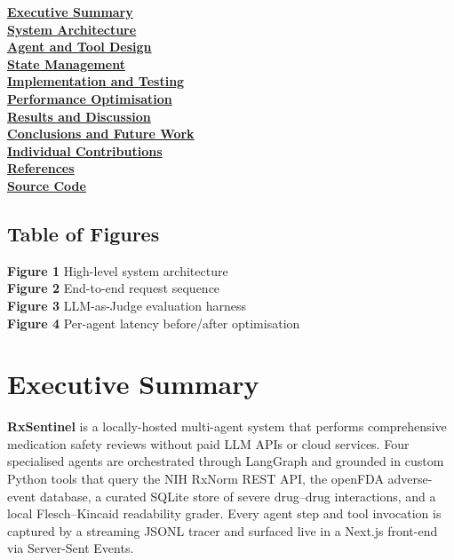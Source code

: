 \documentclass[11pt]{article}
\begin{document}
{\setlength{\parskip}{0.2em}
\noindent
\textbf{\hyperref[execsum]{Executive Summary}} \\
\textbf{\hyperref[arch]{System Architecture}} \\
\textbf{\hyperref[agents]{Agent and Tool Design}} \\
\textbf{\hyperref[state]{State Management}} \\
\textbf{\hyperref[impl]{Implementation and Testing}} \\
\textbf{\hyperref[perf]{Performance Optimisation}} \\
\textbf{\hyperref[results]{Results and Discussion}} \\
\textbf{\hyperref[conclusions]{Conclusions and Future Work}} \\
\textbf{\hyperref[contrib]{Individual Contributions}} \\
\textbf{\hyperref[refs]{References}} \\
\textbf{\hyperref[code]{Source Code}} \\
}

\subsection*{Table of Figures}
{\setlength{\parskip}{0.2em}
\noindent
\textbf{Figure 1} \quad High-level system architecture \\
\textbf{Figure 2} \quad End-to-end request sequence \\
\textbf{Figure 3} \quad LLM-as-Judge evaluation harness \\
\textbf{Figure 4} \quad Per-agent latency before/after optimisation \\
}

\newpage

\section*{Executive Summary}\label{execsum}

\textbf{RxSentinel} is a locally-hosted multi-agent system that performs
comprehensive medication safety reviews without paid LLM APIs or cloud
services. Four specialised agents are orchestrated through LangGraph and
grounded in custom Python tools that query the NIH RxNorm REST API, the
openFDA adverse-event database, a curated SQLite store of severe
drug–drug interactions, and a local Flesch–Kincaid readability grader.
Every agent step and tool invocation is captured by a streaming JSONL
tracer and surfaced live in a Next.js front-end via Server-Sent Events.
\end{document}
